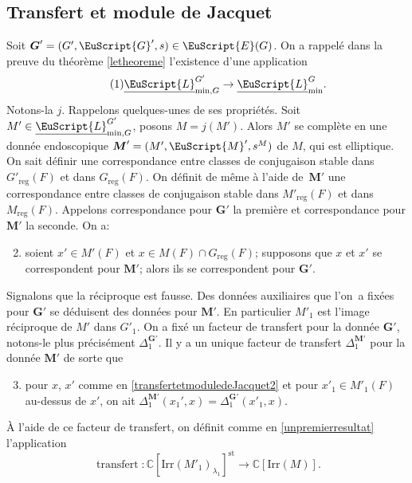 \documentclass[JEP,XML,SOM,Unicode,francais]{cedram}
\let\mathcal \EuScript
\newcommand{\NoChangel}[1]{%
\expandafter\let\csname old\string#1\endcsname=#1
\let#1=\relax
\newcommand{#1}{\mathcode`l="716C\csname old\string#1\endcsname\mathcode`l="7160 }%
}
\newcommand{\Irr}{\mathrm{Irr}}
\newcommand{\trel}{\textup{-rel}} \NoChangel{\trel}
\newcommand{\reg}{\mathrm{reg}}
\newcommand{\st}{\mathrm{st}}
\DeclareMathOperator{\transfert}{transfert}
\newcommand{\bG}{\boldsymbol{G}}
\newcommand{\bM}{\boldsymbol{M}}
\newcommand{\cE}{\mathcal{E}}
\newcommand{\cG}{\mathcal{G}}
\newcommand{\cL}{\mathcal{L}}
\newcommand{\cM}{\mathcal{M}}
\newcommand{\CC}{\mathbb{C}}
\theoremstyle{plain}
\theoremstyle{definition}
\begin{document}
\subsection{Transfert et module de Jacquet}\label{transfertetmoduledeJacquet}
Soit $\bG'=(G',\cG',s)\in \cE(G)$. On a rappelé dans la preuve du théorème \ref{letheoreme} l'existence d'une application
\begin{equation}\tag{1}\label{transfertetmoduledeJacquet1}
\underline{\cL}_{\min,G\trel}^{G'}\to\underline{\cL}_{\min}^G.
\end{equation}
Notons-la $j$. Rappelons quelques-unes de ses propriétés. Soit $M'\in
\underline{\cL}_{\min,G\trel}^{G'}$, posons
$M=j(M')$. Alors $M'$ se complète en une donnée endoscopique $\bM'=(M',\cM',s^M)$ de $M$, qui est elliptique.
On sait définir une correspondance entre classes de conjugaison stable dans $G'_{\reg}(F)$ et dans $G_{\reg}(F)$. On définit de même à l'aide de~$\bM'$ une correspondance entre classes de conjugaison stable dans $M'_{\reg}(F)$ et dans $M_{\reg}(F)$. Appelons correspondance pour $\bG'$ la première et correspondance pour $\bM'$ la seconde. On a:
\begin{enumerate}\setcounter{enumi}{1}
\item\label{transfertetmoduledeJacquet2}
soient $x'\in M'(F)$ et $x\in M(F)\cap G_{\reg}(F)$; supposons que $x$ et $x'$ se correspondent pour $\bM'$; alors ils se correspondent pour $\bG'$.
\end{enumerate}

Signalons que la réciproque est fausse.
Des données auxiliaires que l'on~a fixées pour $\bG'$ se déduisent des données pour $\bM'$. En particulier $M'_{1}$ est l'image réciproque de $M'$ dans $G'_{1}$. On a fixé un facteur de transfert pour la donnée $\bG'$, notons-le plus précisément $\Delta_{1}^{\bG'}$. Il y a un unique facteur de transfert $\Delta_{1}^{\bM'}$ pour la donnée $\bM'$ de sorte que
\begin{enumerate}\setcounter{enumi}{2}
\item\label{transfertetmoduledeJacquet3}
pour $x$, $x'$ comme en \eqref{transfertetmoduledeJacquet2} et pour $x'_{1}\in M'_{1}(F)$ au-dessus de $x'$, on ait
$\Delta_{1}^{\bM'}(x_{1}',x)=\Delta_{1}^{\bG'}(x'_{1},x)$.
\end{enumerate}

À l'aide de ce facteur de transfert, on définit comme en \ref{unpremierresultat} l'application
\[
\transfert:\CC[\Irr(M'_{1})_{\lambda_{1}}]^{\st}\to \CC[\Irr(M)].
\]
\end{document}
